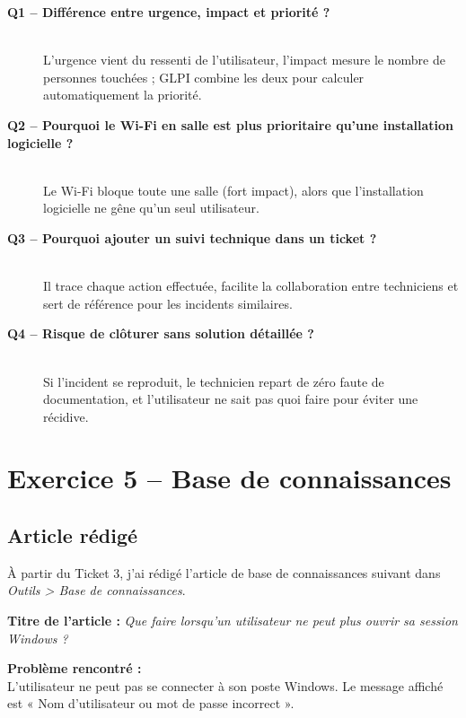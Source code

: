\documentclass[a4paper,11pt]{article}
\begin{document}
\begin{qabox}
\begin{description}
    \item[\textbf{Q1 -- Différence entre urgence, impact et priorité ?}]~\\
    L'urgence vient du ressenti de l'utilisateur, l'impact mesure le nombre de personnes touchées ; GLPI combine les deux pour calculer automatiquement la priorité.

    \item[\textbf{Q2 -- Pourquoi le Wi-Fi en salle est plus prioritaire qu'une installation logicielle ?}]~\\
    Le Wi-Fi bloque toute une salle (fort impact), alors que l'installation logicielle ne gêne qu'un seul utilisateur.

    \item[\textbf{Q3 -- Pourquoi ajouter un suivi technique dans un ticket ?}]~\\
    Il trace chaque action effectuée, facilite la collaboration entre techniciens et sert de référence pour les incidents similaires.

    \item[\textbf{Q4 -- Risque de clôturer sans solution détaillée ?}]~\\
    Si l'incident se reproduit, le technicien repart de zéro faute de documentation, et l'utilisateur ne sait pas quoi faire pour éviter une récidive.
\end{description}
\end{qabox}

\newpage

\section{Exercice 5 -- Base de connaissances}

\subsection{Article rédigé}

À partir du Ticket 3, j'ai rédigé l'article de base de connaissances suivant dans \textit{Outils > Base de connaissances}.

\vspace{0.6em}
\noindent\textbf{Titre de l'article :} \textit{Que faire lorsqu'un utilisateur ne peut plus ouvrir sa session Windows ?}

\vspace{0.5em}
\noindent\textbf{Problème rencontré :}\\
L'utilisateur ne peut pas se connecter à son poste Windows. Le message affiché est « Nom d'utilisateur ou mot de passe incorrect ».
\end{document}
